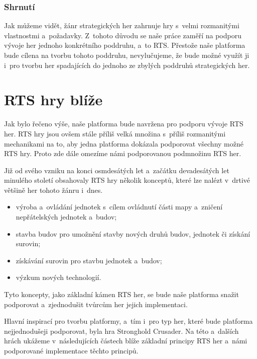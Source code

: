 \subsubsection{Shrnutí}

Jak můžeme vidět, žánr strategických her zahrnuje hry s~velmi rozmanitými vlastnostmi a~požadavky. Z~tohoto důvodu se naše práce zaměří na podporu vývoje her jednoho konkrétního poddruhu, a~to RTS. Přestože naše platforma bude cílena na tvorbu tohoto poddruhu, nevylučujeme, že bude možné využít ji i~pro tvorbu her spadajících do jednoho ze zbylých poddruhů strategických her.


\section{RTS hry blíže}
Jak bylo řečeno výše, naše platforma bude navržena pro podporu vývoje RTS her. RTS hry jsou ovšem stále příliš velká množina s~příliš rozmanitými mechanikami na to, aby jedna platforma dokázala podporovat všechny možné RTS hry. Proto zde dále omezíme námi podporovanou podmnožinu RTS her.

Již od svého vzniku na konci osmdesátých let a~začátku devadesátých let minulého století obsahovaly RTS hry několik konceptů, které lze nalézt v~drtivé většině her tohoto žánru i~dnes. 

\begin{itemize}
	\item výroba a~ovládání jednotek s~cílem ovládnutí části mapy a~zničení nepřátelských jednotek a~budov;
	\item stavba budov pro umožnění stavby nových druhů budov, jednotek či získání surovin;
	\item získávání surovin pro stavbu jednotek a~budov;
	\item výzkum nových technologií.
\end{itemize}

Tyto koncepty, jako základní kámen RTS her, se bude naše platforma snažit podporovat a~zjednodušit tvůrcům her jejich implementaci.

Hlavní inspirací pro tvorbu platformy, a~tím i~pro typ her, které bude platforma nejjednodušeji podporovat, byla hra Stronghold Crusader. Na této a~dalších hrách ukážeme v~následujících částech blíže základní principy RTS her a~námi podporované implementace těchto principů.

\done
{}
